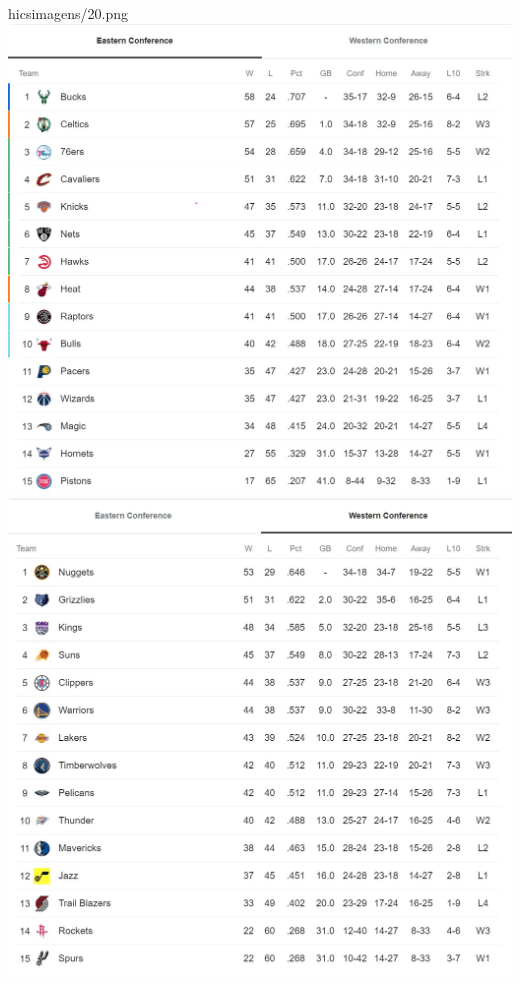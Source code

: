 \documentclass[
]{book}
\begin{document}
hics{imagens/20.png} \includegraphics{imagens/21.jpeg} \includegraphics{imagens/22.jpeg} \
\end{document}
